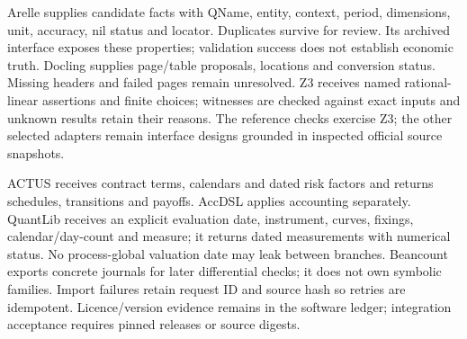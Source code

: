 Arelle supplies candidate facts with QName, entity, context, period,
dimensions, unit, accuracy, nil status and locator. Duplicates survive for
review. Its archived  interface exposes these
properties; validation success does not establish economic truth. Docling
supplies page/table proposals, locations and conversion status. Missing
headers and failed pages remain unresolved. Z3 receives named rational-linear
assertions and finite choices; witnesses are checked against exact inputs and
unknown results retain their reasons. The reference checks exercise Z3;
the other selected adapters remain interface designs grounded in inspected
official source snapshots.

ACTUS receives contract terms, calendars and dated risk factors and returns
schedules, transitions and payoffs. AccDSL applies accounting separately.
QuantLib receives an explicit evaluation date, instrument, curves, fixings,
calendar/day-count and measure; it returns dated measurements with numerical
status. No process-global valuation date may leak between branches.
Beancount exports concrete journals for later differential checks; it does
not own symbolic families. Import failures retain request ID and source hash
so retries are idempotent. Licence/version evidence remains in the software
ledger; integration acceptance requires pinned releases or source digests.


